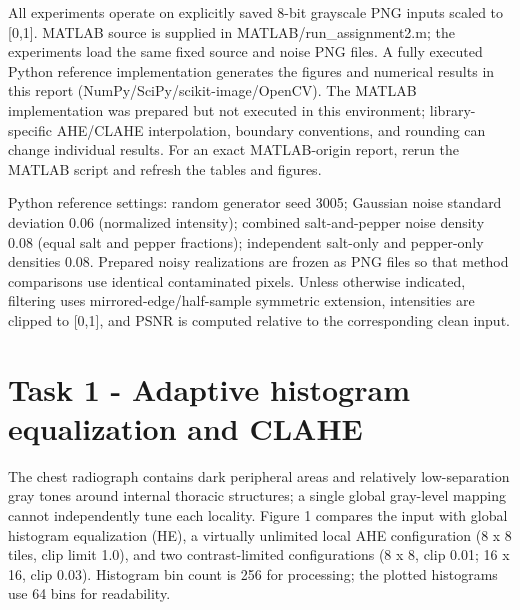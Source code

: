 \documentclass[10pt,a4paper]{article}
\begin{document}
All experiments operate on explicitly saved 8-bit grayscale PNG inputs scaled to [0,1]. MATLAB source is supplied in MATLAB/run\_assignment2.m; the experiments load the same fixed source and noise PNG files. A fully executed Python reference implementation generates the figures and numerical results in this report (NumPy/SciPy/scikit-image/OpenCV). The MATLAB implementation was prepared but not executed in this environment; library-specific AHE/CLAHE interpolation, boundary conventions, and rounding can change individual results. For an exact MATLAB-origin report, rerun the MATLAB script and refresh the tables and figures.

Python reference settings: random generator seed 3005; Gaussian noise standard deviation 0.06 (normalized intensity); combined salt-and-pepper noise density 0.08 (equal salt and pepper fractions); independent salt-only and pepper-only densities 0.08. Prepared noisy realizations are frozen as PNG files so that method comparisons use identical contaminated pixels. Unless otherwise indicated, filtering uses mirrored-edge/half-sample symmetric extension, intensities are clipped to [0,1], and PSNR is computed relative to the corresponding clean input.

\section{Task 1 - Adaptive histogram equalization and CLAHE}
The chest radiograph contains dark peripheral areas and relatively low-separation gray tones around internal thoracic structures; a single global gray-level mapping cannot independently tune each locality. Figure 1 compares the input with global histogram equalization (HE), a virtually unlimited local AHE configuration (8 x 8 tiles, clip limit 1.0), and two contrast-limited configurations (8 x 8, clip 0.01; 16 x 16, clip 0.03). Histogram bin count is 256 for processing; the plotted histograms use 64 bins for readability.
\end{document}
